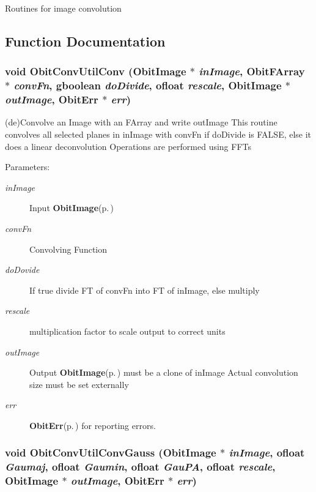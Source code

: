 Routines for image convolution

\subsection{Function Documentation}
\subsubsection{\setlength{\rightskip}{0pt plus 5cm}void Obit\-Conv\-Util\-Conv ({\bf Obit\-Image} $\ast$ {\em in\-Image}, {\bf Obit\-FArray} $\ast$ {\em conv\-Fn}, gboolean {\em do\-Divide}, {\bf ofloat} {\em rescale}, {\bf Obit\-Image} $\ast$ {\em out\-Image}, {\bf Obit\-Err} $\ast$ {\em err})}\label{ObitConvUtil_8h_a0}


(de)Convolve an Image with an FArray and write out\-Image This routine convolves all selected planes in in\-Image with conv\-Fn if do\-Divide is FALSE, else it does a linear deconvolution Operations are performed using FFTs 

\begin{Desc}
\item[Parameters:]
\begin{description}
\item[{\em in\-Image}]Input {\bf Obit\-Image}{\rm (p.\,\pageref{structObitImage})} \item[{\em conv\-Fn}]Convolving Function \item[{\em do\-Dovide}]If true divide FT of conv\-Fn into FT of in\-Image, else multiply \item[{\em rescale}]multiplication factor to scale output to correct units \item[{\em out\-Image}]Output {\bf Obit\-Image}{\rm (p.\,\pageref{structObitImage})} must be a clone of in\-Image Actual convolution size must be set externally \item[{\em err}]{\bf Obit\-Err}{\rm (p.\,\pageref{structObitErr})} for reporting errors. \end{description}
\end{Desc}
\subsubsection{\setlength{\rightskip}{0pt plus 5cm}void Obit\-Conv\-Util\-Conv\-Gauss ({\bf Obit\-Image} $\ast$ {\em in\-Image}, {\bf ofloat} {\em Gaumaj}, {\bf ofloat} {\em Gaumin}, {\bf ofloat} {\em Gau\-PA}, {\bf ofloat} {\em rescale}, {\bf Obit\-Image} $\ast$ {\em out\-Image}, {\bf Obit\-Err} $\ast$ {\em err})}\label{ObitConvUtil_8h_a1}


